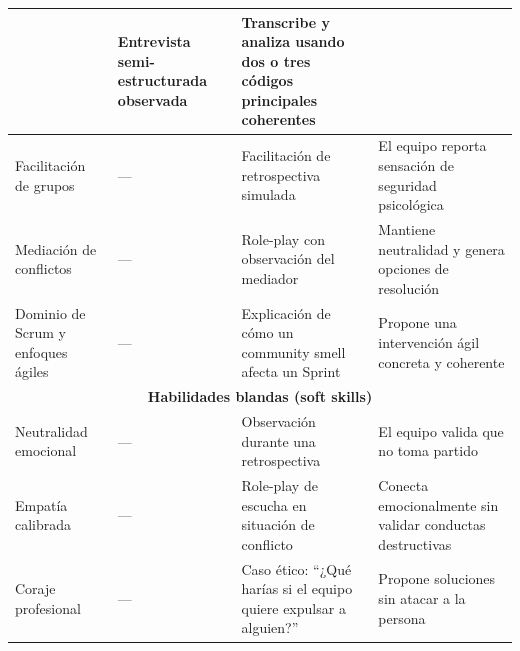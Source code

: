 \begin{table}[h]
\begin{tabularx}{\textwidth}{|p{2.6cm}|X|X|X|}
                      & Entrevista semi-estructurada observada
                      & Transcribe y analiza usando dos o tres códigos principales coherentes                                                                                           \\
        \hline
        Facilitación de grupos
                      & ---
                      & Facilitación de retrospectiva simulada
                      & El equipo reporta sensación de seguridad psicológica                                                                                                            \\
        \hline
        Mediación de conflictos
                      & ---
                      & Role-play con observación del mediador
                      & Mantiene neutralidad y genera opciones de resolución                                                                                                            \\
        \hline
        Dominio de Scrum y enfoques ágiles
                      & ---
                      & Explicación de cómo un community smell afecta un Sprint
                      & Propone una intervención ágil concreta y coherente                                                                                                              \\
        \hline
        \multicolumn{4}{|c|}{\textbf{Habilidades blandas (soft skills)}}                                                                                                                \\
        \hline
        Neutralidad emocional
                      & ---
                      & Observación durante una retrospectiva
                      & El equipo valida que no toma partido                                                                                                                            \\
        \hline
        Empatía calibrada
                      & ---
                      & Role-play de escucha en situación de conflicto
                      & Conecta emocionalmente sin validar conductas destructivas                                                                                                       \\
        \hline
        Coraje profesional
                      & ---
                      & Caso ético: ``¿Qué harías si el equipo quiere expulsar a alguien?''
                      & Propone soluciones sin atacar a la persona                                                                                                                      \\

\end{tabularx}
\end{table}
